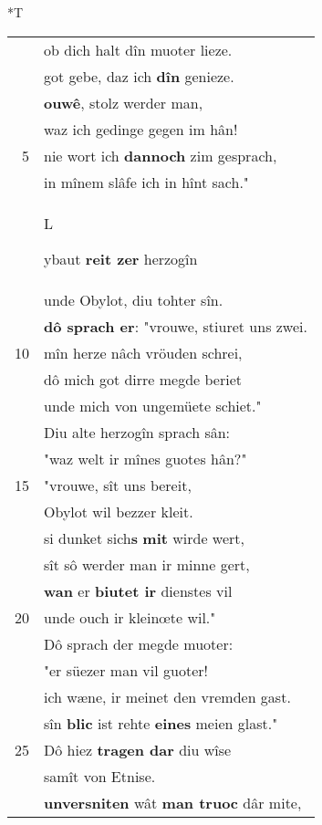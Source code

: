 \documentclass[8pt,a4paper,notitlepage]{article}
\begin{document}
\begin{table}[ht]
\begin{minipage}[t]{0.5\linewidth}
\end{minipage}
\hspace{0.5cm}
\begin{minipage}[t]{0.5\linewidth}
\small
\begin{center}*T
\end{center}
\begin{tabular}{rl}
 & ob dich halt dîn muoter lieze.\\ 
 & got gebe, daz ich \textbf{dîn} genieze.\\ 
 & \textbf{ouwê}, stolz werder man,\\ 
 & waz ich gedinge gegen im hân!\\ 
5 & nie wort ich \textbf{dannoch} zim gesprach,\\ 
 & in mînem slâfe ich in hînt sach."\\ 
 & \begin{large}L\end{large}ybaut \textbf{reit zer} herzogîn\\ 
 & unde Obylot, diu tohter sîn.\\ 
 & \textbf{dô sprach er}: "vrouwe, stiuret uns zwei.\\ 
10 & mîn herze nâch vröuden schrei,\\ 
 & dô mich got dirre megde beriet\\ 
 & unde mich von ungemüete schiet."\\ 
 & Diu alte herzogîn sprach sân:\\ 
 & "waz welt ir mînes guotes hân?"\\ 
15 & "vrouwe, sît uns bereit,\\ 
 & Obylot wil bezzer kleit.\\ 
 & si dunket sich\textbf{s} \textbf{mit} wirde wert,\\ 
 & sît sô werder man ir minne gert,\\ 
 & \textbf{wan} er \textbf{biutet ir} dienstes vil\\ 
20 & unde ouch ir kleinœte wil."\\ 
 & Dô sprach der megde muoter:\\ 
 & "er süezer man vil guoter!\\ 
 & ich wæne, ir meinet den vremden gast.\\ 
 & sîn \textbf{blic} ist rehte \textbf{eines} meien glast."\\ 
25 & Dô hiez \textbf{tragen dar} diu wîse\\ 
 & samît von Etnise.\\ 
 & \textbf{unversniten} wât \textbf{man truoc} dâr mite,\\ 

\end{tabular}
\end{minipage}
\end{table}
\end{document}
